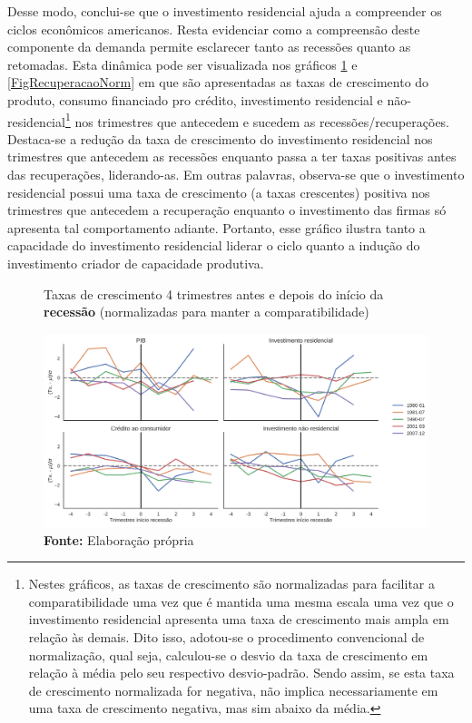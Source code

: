 Desse modo, conclui-se que o investimento residencial ajuda a compreender os ciclos econômicos americanos.
Resta evidenciar como a compreensão deste componente da demanda permite esclarecer tanto as recessões quanto as retomadas. Esta dinâmica pode ser visualizada nos gráficos \ref{FigCriseNorm} e \ref{FigRecuperacaoNorm} em que são apresentadas as taxas de crescimento do produto, consumo financiado pro crédito, investimento residencial e não-residencial\footnote{
	Nestes gráficos, as taxas de crescimento são normalizadas para facilitar a comparatibilidade uma vez que é mantida uma mesma escala uma vez que o investimento residencial apresenta uma taxa de crescimento mais ampla em relação às demais. 
	Dito isso, adotou-se o procedimento convencional de normalização, qual seja, calculou-se o desvio da taxa de crescimento em relação à média pelo seu respectivo desvio-padrão.
	Sendo assim, se esta taxa de crescimento normalizada for negativa, não implica necessariamente em uma taxa de crescimento negativa, mas sim abaixo da média.
} nos trimestres que antecedem e sucedem as recessões/recuperações. 
Destaca-se a redução da taxa de crescimento do investimento residencial nos trimestres que antecedem as recessões enquanto passa a ter taxas positivas antes das recuperações, liderando-as.
Em outras palavras, observa-se que o investimento residencial possui uma taxa de crescimento (a taxas crescentes) positiva nos trimestres que antecedem a recuperação enquanto o investimento das firmas só apresenta tal comportamento adiante. Portanto, esse gráfico ilustra tanto a capacidade do investimento residencial liderar o ciclo quanto a indução do investimento criador de capacidade produtiva.


\begin{figure}[H]
	\centering
	\caption{Taxas de crescimento 4 trimestres antes e depois do início da  \textbf{recessão} (normalizadas para manter a comparatibilidade)}
	\label{FigCriseNorm}
	\includegraphics[width=\textwidth]{../../Dados/Fatos_Estilizados/figs/Centrado_Inicio_Norm.png}
	\caption*{\textbf{Fonte:} Elaboração própria}
\end{figure}

